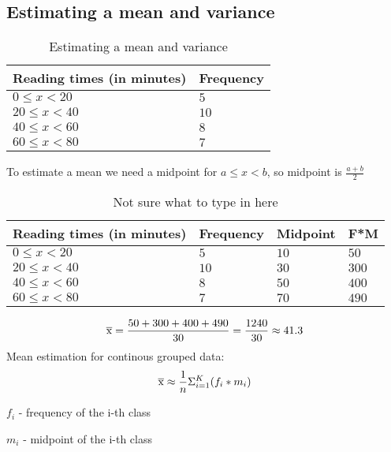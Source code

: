 \documentclass{article}
\begin{document}
\subsection{Estimating a mean and variance}
\begin{table}[htbp]
  \centering
  \begin{tabular}{|l|l|}
    \hline
    \textbf{Reading times (in minutes)} & \textbf{Frequency} \\
    \hline
    $0 \leqslant x < 20$ & $5$ \\
    \hline
    $20 \leqslant x < 40$ & $10$ \\
    \hline
    $40 \leqslant x < 60$ & $8$ \\
    \hline
    $60 \leqslant x < 80$ & $7$ \\
    \hline
  \end{tabular}
  \caption{Estimating a mean and variance}
  \label{tab:estimating_a_mean_and_variance}
\end{table}
To estimate a mean we need a midpoint for $a \leqslant x < b$, so midpoint is $\frac{a+b}{2}$
\begin{table}[htbp]
  \centering
  \begin{tabular}{|l|l|l|l|}
    \hline
    \textbf{Reading times (in minutes)} & \textbf{Frequency} & \textbf{Midpoint} & \textbf{F*M} \\
    \hline
    $0 \leqslant x < 20$ & $5$ & $10$ & $50$ \\
    \hline
    $20 \leqslant x < 40$ & $10$ & $30$ & $300$ \\
    \hline
    $40 \leqslant x < 60$ & $8$ & $50$ & $400$ \\
    \hline
    $60 \leqslant x < 80$ & $7$ & $70$ & $490$ \\
    \hline
  \end{tabular}
  \caption{Not sure what to type in here}
  \label{tab:estimating_a_mean_and_variance_2}
\end{table}
\begin{equation}
  \overline{\rm x} = \frac{50+300+400+490}{30} = \frac{1240}{30} \approx 41.3
\end{equation}
Mean estimation for continous grouped data:
\begin{equation}
  \overline{\rm x} \approx \frac{1}{n}\Sigma^K_{i=1}(f_i * m_i)
\end{equation}

$f_i$ - frequency of the i-th class

$m_i$ - midpoint of the i-th class
\end{document}
